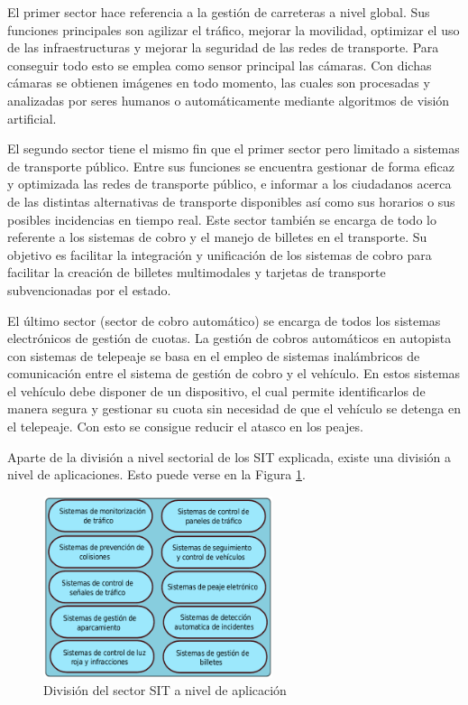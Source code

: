 El primer sector hace referencia a la gestión de carreteras a nivel global. Sus funciones principales son agilizar el tráfico, mejorar la movilidad, optimizar el uso de las infraestructuras y mejorar la seguridad de las redes de transporte. Para conseguir todo esto se emplea como sensor principal las cámaras. Con dichas cámaras se obtienen imágenes en todo momento, las cuales son procesadas y analizadas por seres humanos o automáticamente mediante algoritmos de visión artificial.  

El segundo sector tiene el mismo fin que el primer sector pero limitado a sistemas de transporte público. Entre sus funciones se encuentra gestionar de forma eficaz y optimizada las redes de transporte público, e informar  a los ciudadanos acerca de las distintas alternativas de transporte disponibles así como sus horarios o sus posibles incidencias en tiempo real. Este sector también se encarga de todo lo referente a los sistemas de cobro y el manejo de billetes en el transporte. Su objetivo es facilitar la integración y unificación de los sistemas de cobro para facilitar la creación de billetes multimodales y tarjetas de transporte subvencionadas por el estado.

El último sector (sector de cobro automático) se encarga de todos los sistemas electrónicos de gestión de cuotas. La gestión de cobros automáticos en autopista con sistemas de telepeaje se basa en el empleo de sistemas inalámbricos de comunicación entre el sistema de gestión de cobro y el vehículo. En estos sistemas el vehículo debe disponer de un dispositivo, el cual permite identificarlos de manera segura y gestionar su cuota sin necesidad de que el vehículo se detenga en el telepeaje. Con esto se consigue reducir el atasco en los peajes.

Aparte de la división a nivel sectorial de los SIT explicada, existe una división a nivel de aplicaciones. Esto puede verse en la Figura \ref{fig.division_SIT}.

\begin{figure}[H]
  \begin{center}
    \includegraphics[width=0.6\textwidth]{figures/Introduccion/Division_SIT.png}
		\caption{División del sector SIT a nivel de aplicación}
		\label{fig.division_SIT}
		\end{center}
\end{figure}

